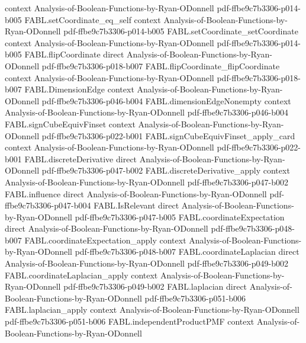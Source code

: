 \begin{theorem}
  {context}
  {Analysis-of-Boolean-Functions-by-Ryan-ODonnell}
  {pdf-ffbe9c7b3306-p014-b005}
\proofstep
  {FABL.setCoordinate_eq_self}
  {context}
  {Analysis-of-Boolean-Functions-by-Ryan-ODonnell}
  {pdf-ffbe9c7b3306-p014-b005}
\proofstep
  {FABL.setCoordinate_setCoordinate}
  {context}
  {Analysis-of-Boolean-Functions-by-Ryan-ODonnell}
  {pdf-ffbe9c7b3306-p014-b005}
\proofstep
  {FABL.flipCoordinate}
  {direct}
  {Analysis-of-Boolean-Functions-by-Ryan-ODonnell}
  {pdf-ffbe9c7b3306-p018-b007}
\proofstep
  {FABL.flipCoordinate_flipCoordinate}
  {context}
  {Analysis-of-Boolean-Functions-by-Ryan-ODonnell}
  {pdf-ffbe9c7b3306-p018-b007}
\proofstep
  {FABL.DimensionEdge}
  {context}
  {Analysis-of-Boolean-Functions-by-Ryan-ODonnell}
  {pdf-ffbe9c7b3306-p046-b004}
\proofstep
  {FABL.dimensionEdgeNonempty}
  {context}
  {Analysis-of-Boolean-Functions-by-Ryan-ODonnell}
  {pdf-ffbe9c7b3306-p046-b004}
\proofstep
  {FABL.signCubeEquivFinset}
  {context}
  {Analysis-of-Boolean-Functions-by-Ryan-ODonnell}
  {pdf-ffbe9c7b3306-p022-b001}
\proofstep
  {FABL.signCubeEquivFinset_apply_card}
  {context}
  {Analysis-of-Boolean-Functions-by-Ryan-ODonnell}
  {pdf-ffbe9c7b3306-p022-b001}
\proofstep
  {FABL.discreteDerivative}
  {direct}
  {Analysis-of-Boolean-Functions-by-Ryan-ODonnell}
  {pdf-ffbe9c7b3306-p047-b002}
\proofstep
  {FABL.discreteDerivative_apply}
  {context}
  {Analysis-of-Boolean-Functions-by-Ryan-ODonnell}
  {pdf-ffbe9c7b3306-p047-b002}
\proofstep
  {FABL.influence}
  {direct}
  {Analysis-of-Boolean-Functions-by-Ryan-ODonnell}
  {pdf-ffbe9c7b3306-p047-b004}
\proofstep
  {FABL.IsRelevant}
  {direct}
  {Analysis-of-Boolean-Functions-by-Ryan-ODonnell}
  {pdf-ffbe9c7b3306-p047-b005}
\proofstep
  {FABL.coordinateExpectation}
  {direct}
  {Analysis-of-Boolean-Functions-by-Ryan-ODonnell}
  {pdf-ffbe9c7b3306-p048-b007}
\proofstep
  {FABL.coordinateExpectation_apply}
  {context}
  {Analysis-of-Boolean-Functions-by-Ryan-ODonnell}
  {pdf-ffbe9c7b3306-p048-b007}
\proofstep
  {FABL.coordinateLaplacian}
  {direct}
  {Analysis-of-Boolean-Functions-by-Ryan-ODonnell}
  {pdf-ffbe9c7b3306-p049-b002}
\proofstep
  {FABL.coordinateLaplacian_apply}
  {context}
  {Analysis-of-Boolean-Functions-by-Ryan-ODonnell}
  {pdf-ffbe9c7b3306-p049-b002}
\proofstep
  {FABL.laplacian}
  {direct}
  {Analysis-of-Boolean-Functions-by-Ryan-ODonnell}
  {pdf-ffbe9c7b3306-p051-b006}
\proofstep
  {FABL.laplacian_apply}
  {context}
  {Analysis-of-Boolean-Functions-by-Ryan-ODonnell}
  {pdf-ffbe9c7b3306-p051-b006}
\proofstep
  {FABL.independentProductPMF}
  {context}
  {Analysis-of-Boolean-Functions-by-Ryan-ODonnell}

\end{theorem}
